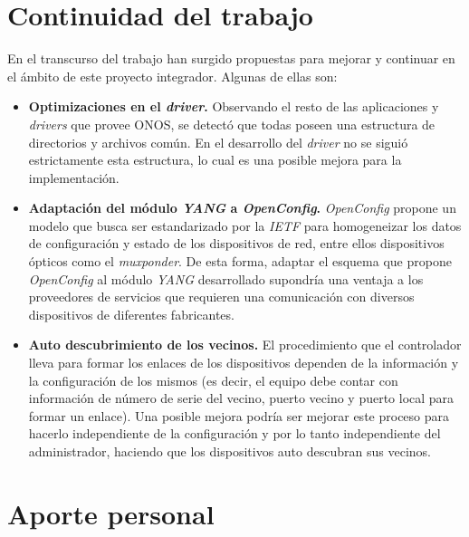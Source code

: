\section{Continuidad del trabajo} %

En el transcurso del trabajo han surgido propuestas para mejorar y continuar en el ámbito de este proyecto integrador. Algunas de ellas son:

\begin{itemize}

    
    \item \textbf{Optimizaciones en el \textit{driver}.} Observando el resto de las aplicaciones y \textit{drivers} que provee ONOS, se detectó que todas poseen una estructura de directorios y archivos común. En el desarrollo del \textit{driver} no se siguió estrictamente esta estructura, lo cual es una posible mejora para la implementación.

    \item \textbf{Adaptación del módulo \textit{YANG} a \textit{OpenConfig}.} \textit{OpenConfig} propone un modelo que busca ser estandarizado por la \textit{IETF} para homogeneizar los datos de configuración y estado de los dispositivos de red, entre ellos dispositivos ópticos como el \textit{muxponder}. De esta forma, adaptar el esquema que propone \textit{OpenConfig} al módulo \textit{YANG} desarrollado supondría una ventaja a los proveedores de servicios que requieren una comunicación con diversos dispositivos de diferentes fabricantes.
    
    \item \textbf{Auto descubrimiento de los vecinos.} El procedimiento que el controlador lleva para formar los enlaces de los dispositivos dependen de la información y la configuración de los mismos (es decir, el equipo debe contar con información de número de serie del vecino, puerto vecino y puerto local para formar un enlace). Una posible mejora podría ser mejorar este proceso para hacerlo independiente de la configuración y por lo tanto independiente del administrador, haciendo que los dispositivos auto descubran sus vecinos. 

\end{itemize}

\section{Aporte personal}

